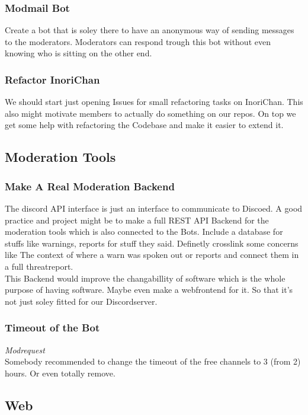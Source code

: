 \documentclass{article}
\begin{document}
    \subsubsection{Modmail Bot}
    \label{sec:modmailbot}
    Create a bot that is soley there to have an anonymous way of sending messages to the moderators. 
    Moderators can respond trough this bot without even knowing who is sitting on the other end.

    \subsubsection{Refactor InoriChan}
    We should start just opening Issues for small refactoring tasks on InoriChan. 
    This also might motivate members to actually do something on our repos. 
    On top we get some help with refactoring the Codebase and make it easier to extend it.

    \subsection{Moderation Tools}

    \subsubsection{Make A Real Moderation Backend}
    The discord API interface is just an interface to communicate to Discoed. 
    A good practice and project might be to make a full REST API Backend for the moderation tools which is also connected to the Bots. 
    Include a database for stuffs like warnings, reports for stuff they said. 
    Definetly crosslink some concerns like The context of where a warn was spoken out or reports and connect them in a full threatreport. \\
    This Backend would improve the changabillity of software which is the whole purpose of having software. 
    Maybe even make a webfrontend for it. So that it's not just soley fitted for our Discordserver.

    \subsubsection{Timeout of the Bot}
    \textit{Modrequest} \\ \newline 
    Somebody recommended to change the timeout of the free channels to 3 (from 2) hours. Or even totally remove.

    \subsection{Web}
\end{document}
